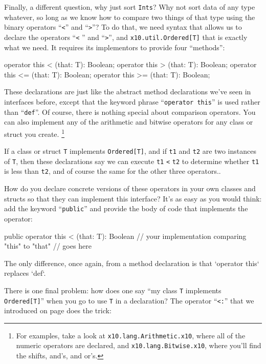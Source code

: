\begin{finepoint}
Finally, a different question, why just sort {\tt Ints}? 
Why not sort data of any type whatever, so long as we know how to compare
two things of that type using the  binary operators ``{\tt <}'' and ``{\tt >}''?   
To do that, 
we need syntax that allows us to declare the operators ``{\tt <} '' and ``{\tt >}'',
and  {\tt x10.util.Ordered[T]} that is exactly what we need.
It requires its implementors to provide four ``methods'':
\begin{xten}
operator this <   (that: T): Boolean;
operator this >   (that: T): Boolean;
operator this <=  (that: T): Boolean;
operator this >=  (that: T): Boolean;
\end{xten}
These declarations are just like the abstract method declarations we've seen in interfaces
before, except that the keyword phrase ``{\tt operator this}'' 
is used rather than ``{\tt def}''.  Of course, there is nothing special about comparison
operators.  You can also implement any of the arithmetic and bitwise operators for
any class or struct you create.
\footnote{
For examples, take a look at {\tt x10.lang.Arithmetic.x10}, where all
of the numeric operators are declared, and {\tt x10.lang.Bit\-wise.x10}, where you'll
find the shifts, and's, and or's. 
}

If a class or struct {\tt T} implements {\tt Ordered[T]}, and if {\tt t1} and {\tt t2}
are two instances of {\tt T}, then these declarations say we can
execute  {\tt t1} {\tt <} {\tt t2} to determine whether {\tt t1} is less than {\tt t2},
and of course the same for the other three operators..

How do you declare concrete versions of these operators in your own classes
and structs so that they can implement this interface?  It's as easy as you would think:
add the keyword ``{\tt public}'' and provide the body of code that implements the 
operator:
\begin{xten}
   public operator this  < (that: T): Boolean {
      // your implementation comparing "this" to "that"
      // goes here
   }
\end{xten}
The only difference, once again, from a method declaration is that  
\xcd`operator this`
replaces \xcd`def`.

There is one final problem: how does one say ``my class {\tt T} implements
{\tt Ordered[T]}'' when you go to use {\tt T} in a declaration?
The operator ``{\tt <:}'' that we introduced on page
\pageref{subsub:type:anything} does the trick:


\end{finepoint}
